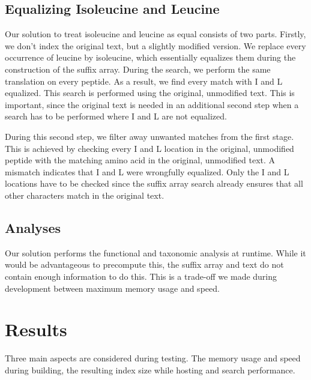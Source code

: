 \documentclass[11pt]{article}
\begin{document}
\begin{multicols}{2}
        \subsection{Equalizing Isoleucine and Leucine}
        Our solution to treat isoleucine and leucine as equal consists of two parts.
        Firstly, we don't index the original text, but a slightly modified version.
        We replace every occurrence of leucine by isoleucine, which essentially equalizes them during the construction of the suffix array.
        During the search, we perform the same translation on every peptide.
        As a result, we find every match with I and L equalized.
        This search is performed using the original, unmodified text.
        This is important, since the original text is needed in an additional second step when a search has to be performed where I and L are not equalized.

        During this second step, we filter away unwanted matches from the first stage.
        This is achieved by checking every I and L location in the original, unmodified peptide with the matching amino acid in the original, unmodified text.
        A mismatch indicates that I and L were wrongfully equalized.
        Only the I and L locations have to be checked since the suffix array search already ensures that all other characters match in the original text.

        \subsection{Analyses}
        Our solution performs the functional and taxonomic analysis at runtime.
        While it would be advantageous to precompute this, the suffix array and text do not contain enough information to do this.
        This is a trade-off we made during development between maximum memory usage and speed.


        \section{Results}\label{sec:results}
        Three main aspects are considered during testing.
        The memory usage and speed during building, the resulting index size while hosting and search performance.


\end{multicols}
\end{document}
